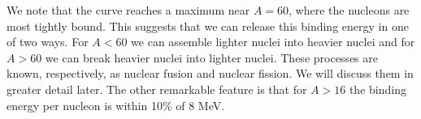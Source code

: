 We note that the curve reaches a maximum near $A = 60$, where the nucleons are most tightly bound.  This suggests that we can release this binding energy in one of two ways.  For $A<60$ we can assemble lighter nuclei into heavier nuclei and for $A>60$ we can break heavier nuclei into lighter nuclei.  These processes are known, respectively, as nuclear fusion and nuclear fission.  We will discuss them in greater detail later.  The other remarkable feature is that for $A>16$ the binding energy per nucleon is within 10\% of 8 MeV.
